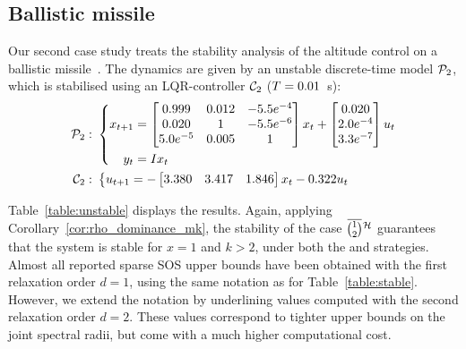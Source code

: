 \subsection{Ballistic missile}\label{sec:eval:unstable}
Our second case study treats the stability analysis of the altitude control on a ballistic missile~\cite{Blakelock:1991, Sree:2006}.
The dynamics are given by an unstable discrete-time model $\mathcal{P}_2$, which is stabilised using an LQR-controller $\mathcal{C}_2$ ($T = 0.01$~s):
\begin{equation*}
    \begin{aligned}
        \mathcal{P}_2: \,\, &\left\{
        \begin{aligned}
            x_{t+1} &= \begin{bmatrix}
                0.999 & 0.012 & -5.5 e^{-4} \\
                0.020 & 1 & -5.5 e^{-6} \\
                5.0 e^{-5} & 0.005 & 1 \\
            \end{bmatrix} x_t + \begin{bmatrix}
                0.020 \\
                2.0e^{-4} \\
                3.3e^{-7} \\
            \end{bmatrix}u_t \\
            y_t &= I x_t
        \end{aligned} \right. \\
        \mathcal{C}_2: \,\, &\left\{
        \begin{aligned}
            u_{t+1} &= -\begin{bmatrix}
                3.380 & 3.417 & 1.846
            \end{bmatrix} x_t - 0.322 u_t
        \end{aligned}\right.
    \end{aligned}
\end{equation*}

Table~\ref{table:unstable} displays the results.
Again, applying Corollary~\ref{cor:rho_dominance_mk}, the stability of the case $\overbar{\binom{1}{2}}^{\strat}$ guarantees that the system is stable for $x=1$ and $k>2$, under both the \tK{} and \tS{} strategies.
Almost all reported sparse SOS upper bounds have been obtained with the first relaxation order $d=1$, using the same notation as for Table~\ref{table:stable}.
However, we extend the notation by underlining values computed with the second relaxation order $d=2$.
These values correspond to tighter upper bounds on the joint spectral radii, but come with a much higher computational cost.
